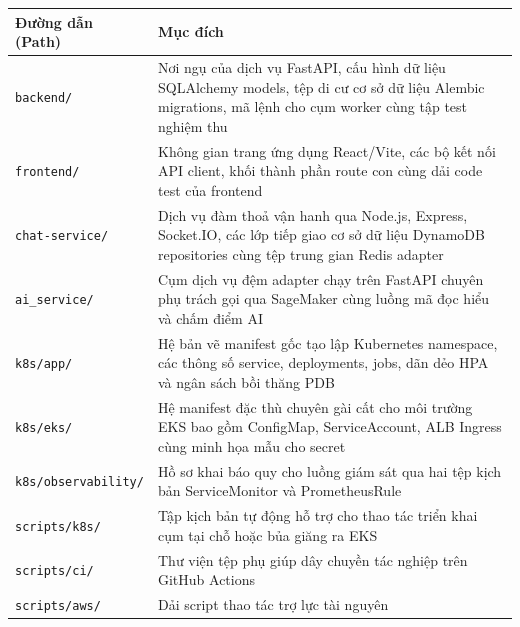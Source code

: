 {
\begingroup
\small
\setlength{\tabcolsep}{3pt}
\renewcommand{\arraystretch}{1.15}
\begin{longtable}{@{}
  >{\raggedright\arraybackslash}p{}
  >{\raggedright\arraybackslash}p{}@{}}
\toprule\noalign{}
\begin{minipage}[b]{\linewidth}\raggedright
Đường dẫn (Path)
\end{minipage} & \begin{minipage}[b]{\linewidth}\raggedright
Mục đích
\end{minipage} \\
\midrule\noalign{}
\endhead
\bottomrule\noalign{}
\endlastfoot
\texttt{backend/\allowbreak{}} & Nơi ngụ của dịch vụ FastAPI, cấu hình dữ liệu
SQLAlchemy models, tệp di cư cơ sở dữ liệu Alembic migrations, mã lệnh
cho cụm worker cùng tập test nghiệm thu \\
\texttt{frontend/\allowbreak{}} & Không gian trang ứng dụng React/Vite, các bộ kết
nối API client, khối thành phần route con cùng dải code test của
frontend \\
\texttt{chat-\allowbreak{}service/\allowbreak{}} & Dịch vụ đàm thoả vận hanh qua Node.js, Express,
Socket.IO, các lớp tiếp giao cơ sở dữ liệu DynamoDB repositories cùng
tệp trung gian Redis adapter \\
\texttt{ai\_\allowbreak{}service/\allowbreak{}} & Cụm dịch vụ đệm adapter chạy trên FastAPI chuyên
phụ trách gọi qua SageMaker cùng luồng mã đọc hiểu và chấm điểm AI \\
\texttt{k8s/\allowbreak{}app/\allowbreak{}} & Hệ bản vẽ manifest gốc tạo lập Kubernetes namespace,
các thông số service, deployments, jobs, dãn dẻo HPA và ngân sách bồi
thăng PDB \\
\texttt{k8s/\allowbreak{}eks/\allowbreak{}} & Hệ manifest đặc thù chuyên gài cất cho môi trường
EKS bao gồm ConfigMap, ServiceAccount, ALB Ingress cùng minh họa mẫu cho
secret \\
\texttt{k8s/\allowbreak{}observability/\allowbreak{}} & Hồ sơ khai báo quy cho luồng giám sát qua
hai tệp kịch bản ServiceMonitor và PrometheusRule \\
\texttt{scripts/\allowbreak{}k8s/\allowbreak{}} & Tập kịch bản tự động hỗ trợ cho thao tác triển
khai cụm tại chỗ hoặc bủa giăng ra EKS \\
\texttt{scripts/\allowbreak{}ci/\allowbreak{}} & Thư viện tệp phụ giúp dây chuyền tác nghiệp trên
GitHub Actions \\
\texttt{scripts/\allowbreak{}aws/\allowbreak{}} & Dải script thao tác trợ lực tài nguyên

\end{longtable}}
